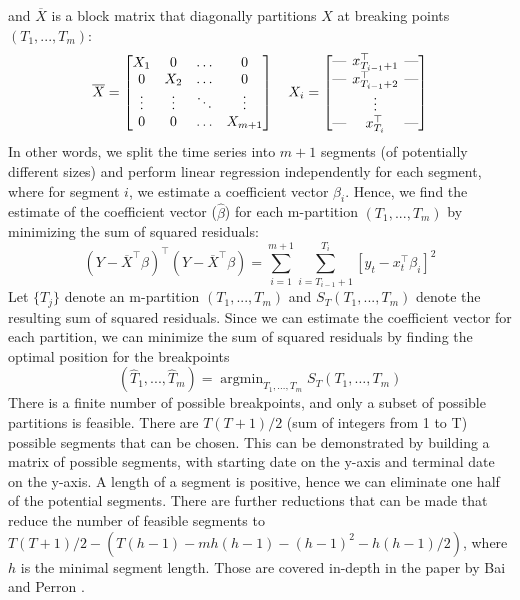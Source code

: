 \documentclass[main.tex]{subfiles}
\begin{document}
and $\overline{X}$ is a block matrix that
diagonally partitions $X$ at breaking points $(T_1,..., T_m)$:
\[
\overline{X} =
\begin{bmatrix}
X_1 & 0 & \hdots & 0\\
 0 & X_2 & \hdots & 0 \\
\vdots & \vdots & \ddots & \vdots \\
 0 & 0 & \hdots & X_{m+1} 
\end{bmatrix}
\quad
X_i = 
\begin{bmatrix}
  \text{---} \hspace{-0.2cm} & x_{T_{i-1} + 1}^{\top} & \hspace{-0.2cm}\text{---} \\
  \text{---} \hspace{-0.2cm} & x_{T_{i-1} + 2}^{\top} & \hspace{-0.2cm}\text{---} \\
  & \vdots & \\ 
 \text{---} \hspace{-0.2cm} & x_{T_i}^{\top} & \hspace{-0.2cm}\text{---}  \\
\end{bmatrix}
\]
In other words, we split the time series into $m+1$ segments (of potentially
different sizes) and perform linear
regression independently for each segment, where for segment $i$, we estimate
a coefficient vector $\beta_i$.
Hence, we find the estimate of the coefficient vector ($\hat{\beta}$) for each
m-partition $(T_1, ..., T_m)$ by minimizing the sum of squared residuals:
\[
(Y - \overline{X}^{\top}\beta)^{\top} (Y - \overline{X}^{\top}\beta) =
\sum_{i=1}^{m+1}\sum_{i=T_{i-1} + 1}^{T_i} \left[ y_t - x_t^{\top}\beta_i \right]^2
\]
Let $\{T_j\}$ denote an m-partition $(T_1, ..., T_m)$ and $S_T(T_1, ..., T_m)$
denote the resulting sum of squared residuals. Since we can estimate the
coefficient vector for each partition, we can minimize the sum of
squared residuals by finding the optimal position for the breakpoints
\[
(\hat{T}_1, ..., \hat{T}_m) = \operatorname{argmin}_{T_{1}, \ldots, T_{m}}
S_{T}\left(T_{1}, \ldots, T_{m}\right)
\]
There is a finite number of possible breakpoints, and only a subset of
possible partitions is feasible. There are $T(T+1)/2$ (sum of integers from 1 to T)
possible segments that can be chosen. This can be demonstrated by building a
matrix of possible segments, with starting date on the y-axis and terminal date
on the y-axis. A length of a segment is positive, hence we can eliminate
one half of the potential segments. There are further reductions
that can be made that reduce the number of feasible segments to
$T(T+1)/2 - \left(T(h-1)-m h(h-1)-(h-1)^{2}-h(h-1) / 2\right)$, where $h$ is the minimal
segment length. Those are covered in-depth
in the paper by Bai and Perron \cite{bai_perron}.\\
\end{document}
